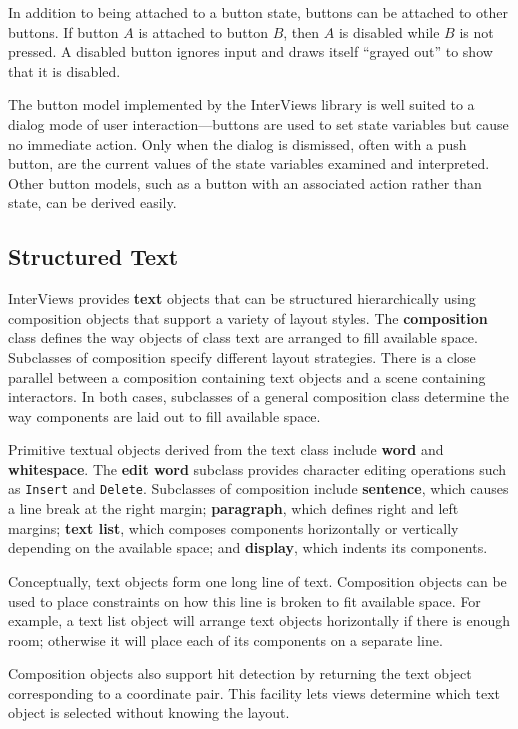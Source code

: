 In addition to being attached to a button state,
buttons can be attached to other buttons.
If button $A$ is attached to button $B$, then $A$ is disabled
while $B$ is not pressed.
A disabled button ignores input and draws itself ``grayed out''
to show that it is disabled.

The button model implemented by the InterViews library is well
suited to a dialog mode of user interaction---buttons are used to
set state variables but cause no immediate action.  Only when
the dialog is dismissed, often with a push button, are
the current values of the state variables examined and interpreted.
Other button models, such as a button with an associated action rather
than state, can be derived easily.

\subsection{Structured Text}
InterViews provides {\bf text}
objects that can be structured hierarchically
using composition objects that support a variety of layout styles.
The {\bf composition} class defines the way objects of 
class text are arranged to fill available
space.  Subclasses of composition specify different layout
strategies.
There is a
close parallel between a composition containing text objects and a
scene containing interactors.  In both cases, subclasses of a general 
composition class determine the way components are laid out to fill
available space.

Primitive textual objects derived from the text class
include {\bf word} and {\bf whitespace}.
The {\bf edit word} subclass
provides character editing operations such as {\tt Insert} and {\tt Delete}.
Subclasses of composition include
{\bf sentence}, which causes a line break at the right
margin;
{\bf paragraph}, which defines right and left margins;
{\bf text list}, which composes components horizontally or
vertically depending on the available space;
and {\bf display}, which indents its components.

Conceptually, text objects
form one long line of text.  Composition objects can be used to place
constraints on how this line is broken to fit available space.
For example, a text list object will arrange
text objects horizontally if there is enough room; otherwise it will
place each of its components on a separate line.

Composition objects also support hit detection by returning
the text object corresponding to a coordinate pair.
This facility lets views
determine which text object is selected without knowing the layout.

